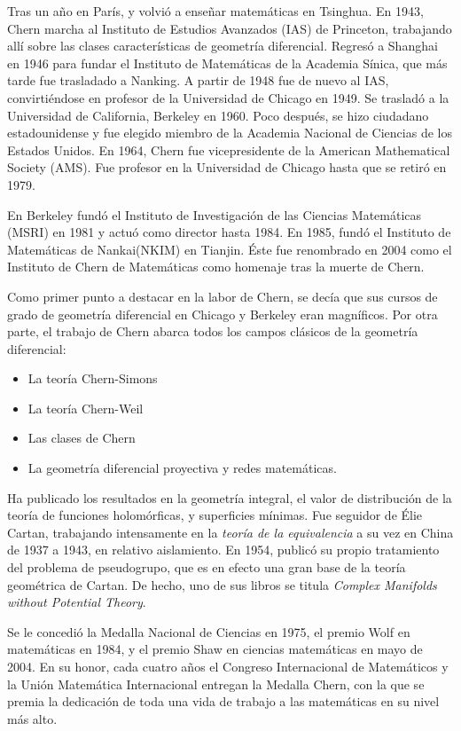 \documentclass[a4paper, 11pt]{article}
\begin{document}
		Tras un año en París, y volvió a enseñar matemáticas en Tsinghua. En 1943, Chern marcha al Instituto de Estudios
		Avanzados (IAS) de Princeton, trabajando allí sobre las clases características de geometría diferencial. Regresó
		a Shanghai en 1946 para fundar el Instituto de Matemáticas de la Academia Sínica, que más tarde fue trasladado a
		Nanking. A partir de 1948 fue de nuevo al IAS, convirtiéndose en profesor de la Universidad de Chicago en 1949.
		Se trasladó a la Universidad de California, Berkeley en 1960. Poco después, se hizo ciudadano estadounidense y
		fue elegido miembro de la Academia Nacional de Ciencias de los Estados Unidos. En 1964, Chern fue vicepresidente
		de la American Mathematical Society (AMS). Fue profesor en la Universidad de Chicago hasta que se retiró en 1979.
		 
		En Berkeley fundó el Instituto de Investigación de las Ciencias Matemáticas (MSRI) en 1981 y actuó como director
		hasta 1984. En 1985, fundó el Instituto de Matemáticas de Nankai(NKIM) en Tianjin. Éste fue renombrado en 2004
		como el Instituto de Chern de Matemáticas como homenaje tras la muerte de Chern.
		
		Como primer punto a destacar en la labor de Chern, se decía que sus cursos de grado de geometría diferencial en
		Chicago y Berkeley eran magníficos. Por otra parte, el trabajo de Chern abarca todos los campos clásicos de la
		geometría diferencial:
		\begin{itemize}
			\item La teoría Chern-Simons
			\item La teoría Chern-Weil
			\item Las clases de Chern
			\item La geometría diferencial proyectiva y redes matemáticas.
		\end{itemize}
		
		Ha publicado los resultados en la geometría integral, el valor de distribución de la teoría de funciones
		holomórficas, y superficies mínimas. Fue seguidor de Élie Cartan, trabajando intensamente en la \textit{teoría
		de la equivalencia} a su vez en China de 1937 a 1943, en relativo aislamiento. En 1954, publicó su propio
		tratamiento del problema de pseudogrupo, que es en efecto una gran base de la teoría geométrica de Cartan.
		De hecho, uno de sus libros se titula \textit{Complex Manifolds without Potential Theory}.
		
		Se le concedió la Medalla Nacional de Ciencias en 1975, el premio Wolf en matemáticas en 1984, y el premio Shaw
		en ciencias matemáticas en mayo de 2004. En su honor, cada cuatro años el Congreso Internacional de Matemáticos y
		la Unión Matemática Internacional entregan la Medalla Chern, con la que se premia la dedicación de toda una vida
		de trabajo a las matemáticas en su nivel más alto.
			
\end{document}
